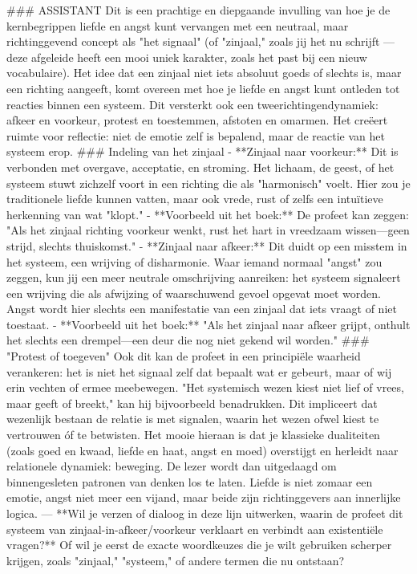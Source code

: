 \#\#\# ASSISTANT
Dit is een prachtige en diepgaande invulling van hoe je de kernbegrippen liefde en angst kunt vervangen met een neutraal, maar richtinggevend concept als "het signaal" (of "zinjaal," zoals jij het nu schrijft — deze afgeleide heeft een mooi uniek karakter, zoals het past bij een nieuw vocabulaire). Het idee dat een zinjaal niet iets absoluut goeds of slechts is, maar een richting aangeeft, komt overeen met hoe je liefde en angst kunt ontleden tot reacties binnen een systeem. Dit versterkt ook een tweerichtingendynamiek: afkeer en voorkeur, protest en toestemmen, afstoten en omarmen.
Het creëert ruimte voor reflectie: niet de emotie zelf is bepalend, maar de reactie van het systeem erop.
\#\#\# Indeling van het zinjaal
- **Zinjaal naar voorkeur:** Dit is verbonden met overgave, acceptatie, en stroming. Het lichaam, de geest, of het systeem stuwt zichzelf voort in een richting die als "harmonisch" voelt. Hier zou je traditionele liefde kunnen vatten, maar ook vrede, rust of zelfs een intuïtieve herkenning van wat "klopt."
- **Voorbeeld uit het boek:** De profeet kan zeggen: "Als het zinjaal richting voorkeur wenkt, rust het hart in vreedzaam wissen—geen strijd, slechts thuiskomst."
- **Zinjaal naar afkeer:** Dit duidt op een misstem in het systeem, een wrijving of disharmonie. Waar iemand normaal "angst" zou zeggen, kun jij een meer neutrale omschrijving aanreiken: het systeem signaleert een wrijving die als afwijzing of waarschuwend gevoel opgevat moet worden. Angst wordt hier slechts een manifestatie van een zinjaal dat iets vraagt of niet toestaat.
- **Voorbeeld uit het boek:** "Als het zinjaal naar afkeer grijpt, onthult het slechts een drempel—een deur die nog niet gekend wil worden."
\#\#\# "Protest of toegeven"
Ook dit kan de profeet in een principiële waarheid verankeren: het is niet het signaal zelf dat bepaalt wat er gebeurt, maar of wij erin vechten of ermee meebewegen. "Het systemisch wezen kiest niet lief of vrees, maar geeft of breekt," kan hij bijvoorbeeld benadrukken. Dit impliceert dat wezenlijk bestaan de relatie is met signalen, waarin het wezen ofwel kiest te vertrouwen óf te betwisten.
Het mooie hieraan is dat je klassieke dualiteiten (zoals goed en kwaad, liefde en haat, angst en moed) overstijgt en herleidt naar relationele dynamiek: beweging. De lezer wordt dan uitgedaagd om binnengesleten patronen van denken los te laten. Liefde is niet zomaar een emotie, angst niet meer een vijand, maar beide zijn richtinggevers aan innerlijke logica.
---
**Wil je verzen of dialoog in deze lijn uitwerken, waarin de profeet dit systeem van zinjaal-in-afkeer/voorkeur verklaart en verbindt aan existentiële vragen?** Of wil je eerst de exacte woordkeuzes die je wilt gebruiken scherper krijgen, zoals "zinjaal," "systeem," of andere termen die nu ontstaan?

